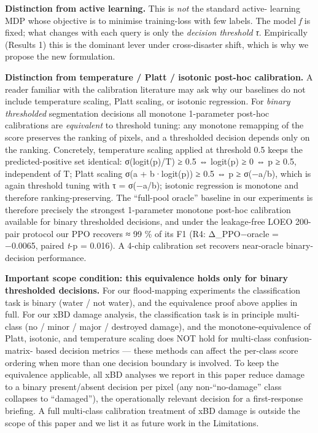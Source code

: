 \textbf{Distinction from active learning.} This is \emph{not} the standard active-
learning MDP whose objective is to minimise training-loss with few labels.
The model \emph{f} is fixed; what changes with each query is only the
\emph{decision threshold τ}. Empirically (Results 1) this is the dominant lever
under cross-disaster shift, which is why we propose the new formulation.

\textbf{Distinction from temperature / Platt / isotonic post-hoc calibration.} A
reader familiar with the calibration literature may ask why our baselines do
not include temperature scaling, Platt scaling, or isotonic regression. For
\emph{binary thresholded} segmentation decisions all monotone 1-parameter
post-hoc calibrations are \emph{equivalent} to threshold tuning: any monotone
remapping of the score preserves the ranking of pixels, and a thresholded
decision depends only on the ranking. Concretely, temperature scaling
applied at threshold 0.5 keeps the predicted-positive set identical:
σ(logit(p)/T) ≥ 0.5 ⇔ logit(p) ≥ 0 ⇔ p ≥ 0.5, independent of T; Platt
scaling σ(a + b·logit(p)) ≥ 0.5 ⇔ p ≥ σ(−a/b), which is again threshold
tuning with τ = σ(−a/b); isotonic regression is monotone and therefore
ranking-preserving. The ``full-pool oracle'' baseline in our experiments is
therefore precisely the strongest 1-parameter monotone post-hoc calibration
available for binary thresholded decisions, and under the leakage-free
LOEO 200-pair protocol our PPO recovers ≈ 99 \% of its F1 (R4:
Δ\_PPO−oracle = −0.0065, paired \emph{t}-p = 0.016). A 4-chip
calibration set recovers near-oracle binary-decision performance.

\textbf{Important scope condition: this equivalence holds only for binary
thresholded decisions.} For our flood-mapping experiments the
classification task is binary (water / not water), and the equivalence
proof above applies in full. For our xBD damage analysis, the
classification task is in principle multi-class (no / minor / major /
destroyed damage), and the monotone-equivalence of Platt, isotonic, and
temperature scaling does NOT hold for multi-class confusion-matrix-
based decision metrics --- these methods can affect the per-class score
ordering when more than one decision boundary is involved. To keep the
equivalence applicable, all xBD analyses we report in this paper
reduce damage to a binary present/absent decision per pixel (any
non-``no-damage'' class collapses to ``damaged''), the operationally
relevant decision for a first-response briefing. A full multi-class
calibration treatment of xBD damage is outside the scope of this paper
and we list it as future work in the Limitations.


